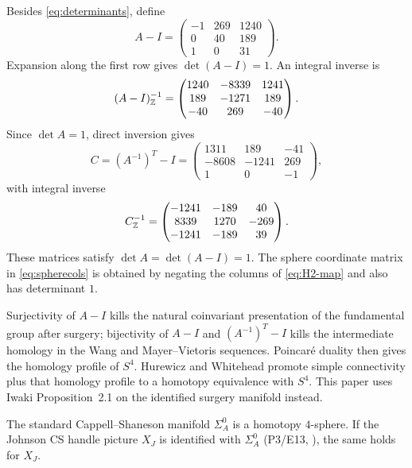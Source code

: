 Besides \eqref{eq:determinants}, define
\begin{equation}\label{eq:A-minus-I}
A-I=
\begin{pmatrix}
-1&269&1240\\
0&40&189\\
1&0&31
\end{pmatrix}.
\end{equation}
Expansion along the first row gives $\det(A-I)=1$.  An integral inverse is
\begin{equation}\label{eq:B-inverse}
(A-I)^{-1}_{\mathbb{Z}}=
\begin{pmatrix}
1240&-8339&1241\\
189&-1271&189\\
-40&269&-40
\end{pmatrix}.
\end{equation}
Since $\det A=1$, direct inversion gives
\begin{equation}\label{eq:H2-map}
C=(A^{-1})^T-I=
\begin{pmatrix}
1311&189&-41\\
-8608&-1241&269\\
1&0&-1
\end{pmatrix},
\end{equation}
with integral inverse
\begin{equation}\label{eq:H2-inverse}
C^{-1}_{\mathbb{Z}}=
\begin{pmatrix}
-1241&-189&40\\
8339&1270&-269\\
-1241&-189&39
\end{pmatrix}.
\end{equation}
These matrices satisfy $\det A=\det(A-I)=1$.  The sphere coordinate matrix in
\eqref{eq:spherecols} is obtained by negating the columns of
\eqref{eq:H2-map} and also has determinant $1$.

\begin{remark}\label{rem:long-topology-route}
Surjectivity of $A-I$ kills the natural coinvariant presentation of the
fundamental group after surgery; bijectivity of $A-I$ and $(A^{-1})^T-I$
kills the intermediate homology in the Wang and Mayer--Vietoris sequences.
Poincar\'e duality then gives the homology profile of $S^4$.  Hurewicz and
Whitehead promote simple connectivity plus that homology profile to a
homotopy equivalence with $S^4$.  This paper uses Iwaki
Proposition~2.1 on the identified surgery manifold instead.
\end{remark}

\begin{corollary}
\label{cor:homotopy-sphere}
The standard Cappell--Shaneson manifold $\Sigma_A^0$ is a homotopy
$4$-sphere.  If the Johnson CS handle picture $X_J$ is identified with
$\Sigma_A^0$ (P3/E13, \Open), the same holds for $X_J$.
\end{corollary}

